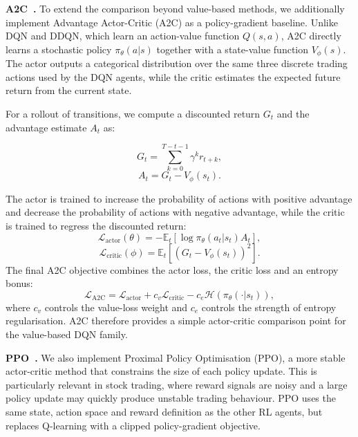 \documentclass[11pt,twocolumn]{article}
\begin{document}
\textbf{A2C~\cite{mnih2016a3c}.}
To extend the comparison beyond value-based methods, we additionally implement Advantage Actor-Critic (A2C) as a policy-gradient baseline. Unlike DQN and DDQN, which learn an action-value function $Q(s,a)$, A2C directly learns a stochastic policy $\pi_\theta(a|s)$ together with a state-value function $V_\phi(s)$. The actor outputs a categorical distribution over the same three discrete trading actions used by the DQN agents,  while the critic estimates the expected future return from the current state.

For a rollout of transitions, we compute a discounted return $G_t$ and the advantage estimate $A_t$ as:

\vspace{-5pt}
\begin{equation}
  G_t = \sum_{k=0}^{T-t-1} \gamma^k r_{t+k},
\end{equation}
\vspace{-7pt}
\begin{equation}
  A_t = G_t - V_\phi(s_t).
\end{equation}

The actor is trained to increase the probability of actions with positive advantage and decrease the probability of actions with negative advantage, while the critic is trained to regress the discounted return:
\vspace{-5pt}
\begin{equation}
  \mathcal{L}_{\text{actor}}(\theta)
  = -\mathbb{E}_t\left[\log \pi_\theta(a_t|s_t) A_t \right],
\end{equation}
\vspace{-10pt}
\begin{equation}
  \mathcal{L}_{\text{critic}}(\phi)
  =
  \mathbb{E}_t
  \left[
  \left(G_t - V_\phi(s_t)\right)^2
  \right].
\end{equation}
The final A2C objective combines the actor loss, the critic loss and an entropy bonus:
\begin{equation}
  \mathcal{L}_{\text{A2C}}
  =
  \mathcal{L}_{\text{actor}}
  + c_v \mathcal{L}_{\text{critic}}
  - c_e \mathcal{H}\!\left(\pi_\theta(\cdot|s_t)\right),
\end{equation}
where $c_v$ controls the value-loss weight and $c_e$ controls the strength of entropy regularisation. A2C therefore provides a simple actor-critic comparison point for the value-based DQN family.

\textbf{PPO~\cite{schulman2017ppo}.}
We also implement Proximal Policy Optimisation (PPO), a more stable actor-critic method that constrains the size of each policy update. This is particularly relevant in stock trading, where reward signals are noisy and a large policy update may quickly produce unstable trading behaviour. PPO uses the same state, action space and reward definition as the other RL agents, but replaces Q-learning with a clipped policy-gradient objective.
\end{document}
